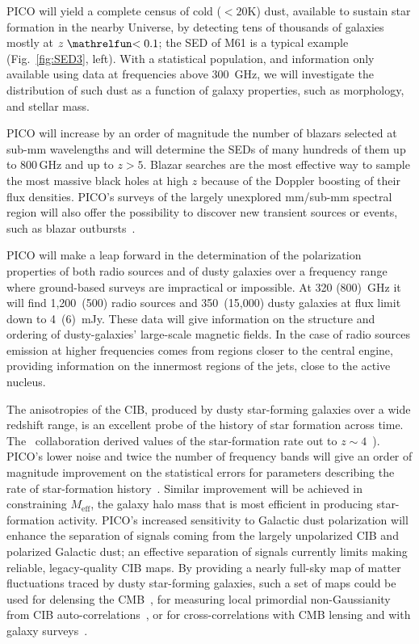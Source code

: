 \documentclass[PICOReport.tex]{subfiles}
\begin{document}
PICO will yield a complete census of cold ($<20$K) dust, available to sustain star formation in the nearby Universe, by detecting tens of thousands of galaxies mostly at $z\simlt 0.1$; the \ac{SED} of M61 is a typical example (Fig.~\ref{fig:SED3}, left). With a statistical population, and information only available using data at frequencies above 300~GHz, we will investigate the distribution of such dust as a function of galaxy properties, such as morphology, and stellar mass. 

PICO will increase by an order of magnitude the number of blazars selected at sub-mm wavelengths and will determine the SEDs of many hundreds of them up to 800\,GHz and up to $z> 5$. Blazar searches are the most effective way to sample the most massive black holes at high $z$ because of the Doppler boosting of their flux densities. PICO's surveys of the largely unexplored mm/sub-mm spectral region will also offer the possibility to discover new transient sources or events, such as blazar outbursts~\cite{Metzger2015}.

PICO will make a leap forward in the determination of the polarization properties of both radio sources and of dusty galaxies over a frequency range where ground-based surveys are impractical or impossible. At 320 (800)~GHz it will find 1,200~(500) radio sources and 350~(15,000) dusty galaxies at flux limit down to 4~(6)~mJy.  These data will give information on the structure and ordering of dusty-galaxies' large-scale magnetic fields. In the case of radio sources emission at higher frequencies comes from regions closer to the central engine, providing information on the innermost regions of the jets, close to the active nucleus. 

The anisotropies of the \ac{CIB}, produced by dusty star-forming galaxies over a wide redshift range, is an excellent probe of the history of star formation across time. The \planck\ collaboration derived values of the star-formation rate out to $z\sim4$~\cite{2014A&A...571A..30P,2014A&A...571A..18P,madau2014}). PICO's lower noise and twice the number of frequency bands will give an order of magnitude improvement on the statistical errors for parameters describing the rate of star-formation history~\cite{Wu:2016hej}. Similar improvement will be achieved in constraining $M_{\mathrm{eff}}$, the galaxy halo mass that is most efficient in producing star-formation activity. PICO's increased sensitivity to Galactic dust polarization will enhance the separation of signals coming from the largely unpolarized \ac{CIB} and polarized Galactic dust; an effective separation of signals currently limits making reliable, legacy-quality \ac{CIB} maps. 
By providing a nearly full-sky map of matter fluctuations traced by dusty star-forming galaxies, such a set of maps could be used for delensing the CMB~\cite{Sherwin/Schmittfull}, for measuring local primordial non-Gaussianity from \ac{CIB} auto-correlations~\cite{tucci}, or for cross-correlations with CMB lensing and with galaxy surveys~\cite{Schmittfull/Seljak}.
\end{document}
